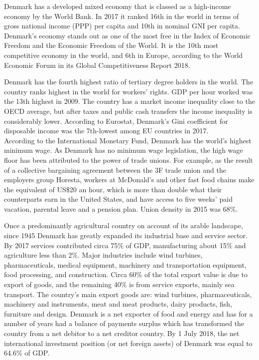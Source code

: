 Denmark has a developed mixed economy that is classed as a high-income
economy by the World Bank. In 2017 it ranked 16th in the world in terms
of gross national income (PPP) per capita and 10th in nominal GNI per
capita. Denmark's economy stands out as one of the most free in the
Index of Economic Freedom and the Economic Freedom of the World. It is
the 10th most competitive economy in the world, and 6th in Europe,
according to the World Economic Forum in its Global Competitiveness
Report 2018.

Denmark has the fourth highest ratio of tertiary degree holders in the
world. The country ranks highest in the world for workers' rights. GDP
per hour worked was the 13th highest in 2009. The country has a market
income inequality close to the OECD average, but after taxes and public
cash transfers the income inequality is considerably lower. According to
Eurostat, Denmark's Gini coefficient for disposable income was the
7th-lowest among EU countries in 2017.\\
According to the International Monetary Fund, Denmark has the world's
highest minimum wage. As Denmark has no minimum wage legislation, the
high wage floor has been attributed to the power of trade unions. For
example, as the result of a collective bargaining agreement between the
3F trade union and the employers group Horesta, workers at McDonald's
and other fast food chains make the equivalent of US\$20 an hour, which
is more than double what their counterparts earn in the United States,
and have access to five weeks' paid vacation, parental leave and a
pension plan. Union density in 2015 was 68\%.

Once a predominantly agricultural country on account of its arable
landscape, since 1945 Denmark has greatly expanded its industrial base
and service sector. By 2017 services contributed circa 75\% of GDP,
manufacturing about 15\% and agriculture less than 2\%. Major industries
include wind turbines, pharmaceuticals, medical equipment, machinery and
transportation equipment, food processing, and construction. Circa 60\%
of the total export value is due to export of goods, and the remaining
40\% is from service exports, mainly sea transport. The country's main
export goods are: wind turbines, pharmaceuticals, machinery and
instruments, meat and meat products, dairy products, fish, furniture and
design. Denmark is a net exporter of food and energy and has for a
number of years had a balance of payments surplus which has transformed
the country from a net debitor to a net creditor country. By 1 July
2018, the net international investment position (or net foreign assets)
of Denmark was equal to 64.6\% of GDP.

